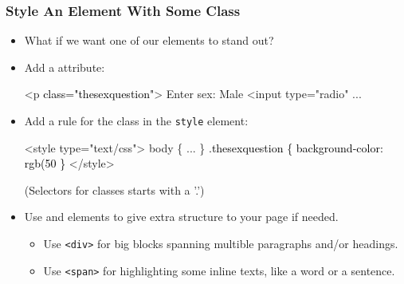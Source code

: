 \documentclass[dvipsnames]{beamer}
\begin{document}
\begin{frame}[fragile]
  \frametitle{Style An Element With Some Class}

  \begin{itemize}
  \item What if we want one of our elements to stand out?
  \item<2-> Add a  attribute:
    \begin{small}\color{gray}
      \begin{semiverbatim}
<p \textcolor{black}{class="thesexquestion"}>
Enter sex: Male <input type="radio" ...
      \end{semiverbatim}
    \end{small}
  \item<3-> Add a rule for the class in the \texttt{style} element:
    \begin{small}\color{gray}
\begin{semiverbatim}
<style type="text/css">
  body \{ ... \}
  \textcolor{black}{.thesexquestion \{ 
     background-color: rgb(50%
  \}}
</style>
\end{semiverbatim}
    \end{small}
    (Selectors for classes starts with a '.')
  \item<4->  Use  and 
    elements to give extra structure to your page if needed.
    \begin{itemize}
    \item Use \texttt{<div>} for big blocks spanning multible
      paragraphs and/or headings.
    \item Use \texttt{<span>} for highlighting some inline texts, like
      a word or a sentence.
    \end{itemize}
  \end{itemize}



\end{frame}






\end{document}
